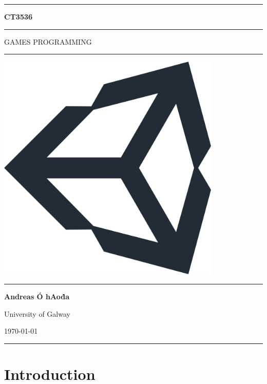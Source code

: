 \documentclass[a4paper,11pt]{article}
\begin{document}
\begin{titlepage}
    \begin{center}
        \hrule
        \vspace*{0.6cm}
        \huge \textbf{CT3536}
        \vspace*{0.6cm}
        \hrule
        \LARGE
       \vspace{0.5cm}
        GAMES PROGRAMMING
       \vspace{0.5cm}
       \hrule
            
       \vfill
       \includegraphics[width=0.8\textwidth]{images/unity-logo.png}
        \vfill

        \Large
       \vspace{0.5cm}
       \hrule
       \vspace{0.5cm}
       \textbf{Andreas Ó hAoḋa}
            
       \normalsize
       University of Galway

       \today

       \vspace{0.5cm}
       \hrule
    \end{center}
\end{titlepage}

\newpage
\tableofcontents
\newpage
\setcounter{page}{1}

\section{Introduction}
\end{document}
